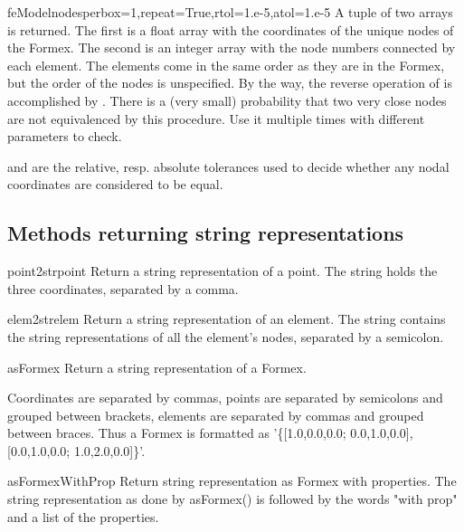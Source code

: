 {{\begin{methoddesc}{feModel}{nodesperbox=1,repeat=True,rtol=1.e-5,atol=1.e-5}
A tuple of two arrays is returned. The first is a float array with the coordinates of the unique nodes of the Formex. The second is an integer array with the node numbers connected by each element. The elements come in the same order as they are in the Formex, but the order of the nodes is unspecified. By the way, the reverse operation of
 is accomplished by . There is a (very small) probability that two very close nodes are not equivalenced by this procedure. Use it multiple times with different parameters to check.

 and  are the relative, resp. absolute tolerances used to decide whether any nodal coordinates are considered to be equal. 
\end{methoddesc}


\subsection{Methods returning string representations}

\begin{methoddesc}{point2str}{point}
Return a string representation of a point. The string holds the three coordinates, separated by a comma. \classmethod
\end{methoddesc}

\begin{methoddesc}{elem2str}{elem}
Return a string representation of an element. The string contains the string representations of all the element's nodes, separated by a semicolon. \classmethod
\end{methoddesc}
    
\begin{methoddesc}{asFormex}{}
Return a string representation of a Formex.

Coordinates are separated by commas, points are separated by semicolons and grouped between brackets, elements are separated by commas and grouped between braces. Thus a Formex  is formatted as '\{[1.0,0.0,0.0; 0.0,1.0,0.0], [0.0,1.0,0.0; 1.0,2.0,0.0]\}'.
\end{methoddesc}

\begin{methoddesc}{asFormexWithProp}{}
Return string representation as Formex with properties. The string representation as done by asFormex() is followed by the words "with prop" and a list of the properties.
\end{methoddesc}
              
}}
